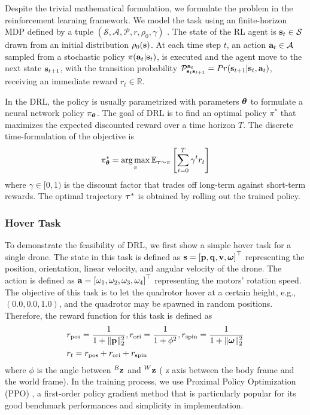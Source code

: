 \documentclass[letterpaper,journal,twoside]{IEEEtran}
\begin{document}
Despite the trivial mathematical formulation, 
we formulate the problem in the reinforcement learning 
framework. 
We model the task using an finite-horizon MDP 
defined by a tuple $\left(
  \mathcal{S}, 
  \mathcal{A}, 
  \mathcal{P}, 
  r, \rho_0, \gamma
\right)$ \cite{sutton2018reinforcement}.
The state of the RL agent is 
$\mathbf{s}_t \in \mathcal{S}$ drawn from 
an initial distribution $\rho_0(\mathbf{s})$.
At each time step $t$, an action $\mathbf{a}_t \in \mathcal{A}$ 
sampled from a stochastic policy $\pi(\mathbf{a}_t | \mathbf{s}_t)$, 
is executed and the agent move to the next state $\mathbf{s}_{t+1}$, 
with the transition probability $\mathcal{P}^{\mathbf{a}_t}_{\mathbf{s}_t\mathbf{s}_{t+1}} = Pr(\mathbf{s}_{t+1} | \mathbf{s}_t, \mathbf{a}_t)$, receiving 
an immediate reward $r_t \in \mathbb{R}$.

In the DRL, the policy is usually parametrized with parameters $\boldsymbol{\theta}$ to formulate a neural network policy $\pi_{\boldsymbol{\theta}}$.
The goal of DRL is to find an optimal policy $\pi^*$ that 
maximizes the expected discounted reward over a time horizon $T$.
The discrete time-formulation of the objective is 
\begin{equation}
  \label{eq:rl_objective}
  \pi^*_{\boldsymbol{\theta}} = \operatorname*{arg\,max}_{\pi} \mathbb{E}_{\boldsymbol{\tau} \sim \pi}
  \left[
    \sum_{t=0}^T \gamma^t r_t
  \right]
\end{equation}
where $\gamma \in [0,1)$ is the discount factor that 
trades off long-term against short-term rewards.
The optimal trajectory $\boldsymbol{\tau}^*$ is obtained by rolling 
out the trained policy.

\subsubsection{Hover Task}
To demonstrate the feasibility of DRL, we first show 
a simple hover task for a single drone.
The state in this task is defined as 
$\mathbf{s} = \left[ \mathbf{p}, \mathbf{q}, \mathbf{v}, \boldsymbol{\omega} \right]^\top$ 
representing the position, orientation, linear velocity, 
and angular velocity of the drone.
The action is defined as 
$\mathbf{a} = \left[ \omega_1, \omega_2, \omega_3, \omega_4 \right]^\top$
representing the motors' rotation speed.
The objective of this task is to let the quadrotor hover 
at a certain height, e.g., $(0.0, 0.0, 1.0)$, and the 
quadrotor may be spawned in random positions.
Therefore, the reward function for this task is defined as 
\begin{equation}
  \label{eq:hover_reward}
  \begin{aligned}
    &r_{\text{pos}} = \frac{1}{1 + \lVert \mathbf{p} \rVert_2^2}, 
    r_{\text{ori}} = \frac{1}{1 + \phi^2}, 
    r_{\text{spin}} = \frac{1}{1 + \lVert \boldsymbol{\omega} \rVert_2^2} \\
    &r_t = r_{\text{pos}} + r_{\text{ori}} + r_{\text{spin}}
  \end{aligned}
\end{equation}
where $\phi$ is the angle between ${}^B\mathbf{z}$ and ${}^W\mathbf{z}$ (
z axis between the body frame and the world frame).
In the training process, we use Proximal Policy Optimization
(PPO) \cite{schulman2017proximal}, a first-order policy gradient method that is particularly popular for its good benchmark performances and simplicity in implementation. 
\end{document}
